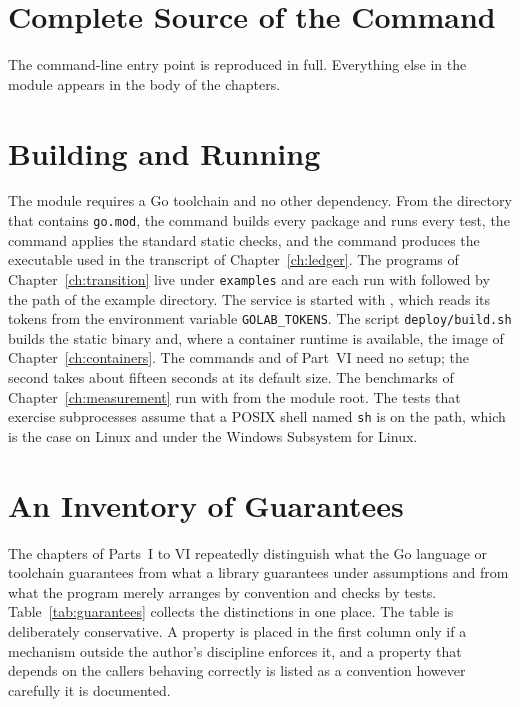 \chapter{Complete Source of the Command}
\label{app:main}

The command-line entry point is reproduced in full. Everything else in the \golab{} module appears in the body of the chapters.


\chapter{Building and Running}
\label{app:build}

The module requires a Go toolchain and no other dependency. From the directory that contains \texttt{go.mod}, the command  builds every package and runs every test, the command  applies the standard static checks, and the command  produces the executable used in the transcript of Chapter~\ref{ch:ledger}. The programs of Chapter~\ref{ch:transition} live under \texttt{examples} and are each run with  followed by the path of the example directory. The service is started with , which reads its tokens from the environment variable \texttt{GOLAB\_TOKENS}. The script \texttt{deploy/build.sh} builds the static binary and, where a container runtime is available, the image of Chapter~\ref{ch:containers}. The commands  and  of Part~VI need no setup; the second takes about fifteen seconds at its default size. The benchmarks of Chapter~\ref{ch:measurement} run with  from the module root. The tests that exercise subprocesses assume that a POSIX shell named \texttt{sh} is on the path, which is the case on Linux and under the Windows Subsystem for Linux.

\chapter{An Inventory of Guarantees}
\label{app:guarantees}

The chapters of Parts~I to VI repeatedly distinguish what the Go language or toolchain guarantees from what a library guarantees under assumptions and from what the program merely arranges by convention and checks by tests. Table~\ref{tab:guarantees} collects the distinctions in one place. The table is deliberately conservative. A property is placed in the first column only if a mechanism outside the author's discipline enforces it, and a property that depends on the callers behaving correctly is listed as a convention however carefully it is documented.

